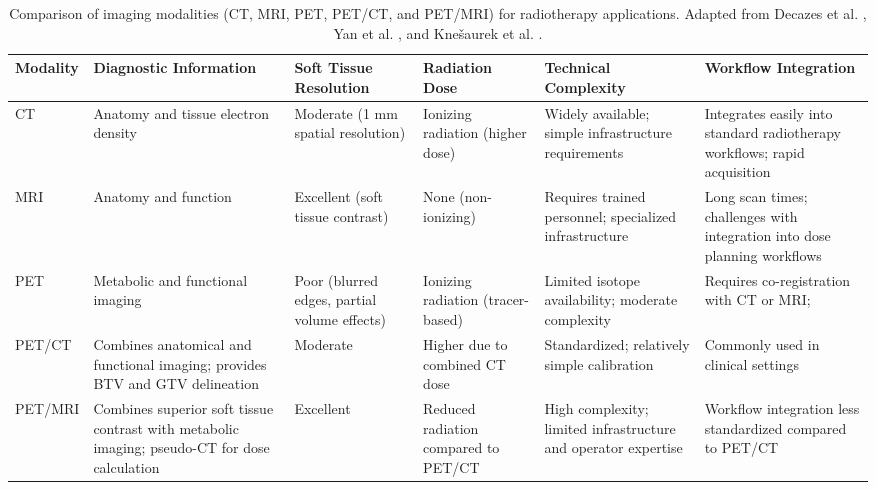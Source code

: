\documentclass[11pt]{article} %
\begin{document}
\begin{landscape}
\begin{table}[H]
\centering
\renewcommand{\arraystretch}{1.5} %
\setlength{\tabcolsep}{6pt} %
\begin{tabular}{|l|>{\raggedright\arraybackslash}p{3.5cm}|>{\raggedright\arraybackslash}p{2.3cm}|>{\raggedright\arraybackslash}p{5.5cm}|>{\raggedright\arraybackslash}p{4.5cm}|>{\raggedright\arraybackslash}p{4.5cm}|}
\hline
\textbf{Modality} & \textbf{Diagnostic Information} & \textbf{Soft Tissue Resolution} & \textbf{Radiation Dose} & \textbf{Technical Complexity} & \textbf{Workflow Integration} \\ \hline
CT & Anatomy and tissue electron density & Moderate (1 mm spatial resolution) & Ionizing radiation (higher dose) & Widely available; simple infrastructure requirements & Integrates easily into standard radiotherapy workflows; rapid acquisition \\ \hline
MRI & Anatomy and function & Excellent (soft tissue contrast) & None (non-ionizing) & Requires trained personnel; specialized infrastructure & Long scan times; challenges with integration into dose planning workflows \\ \hline
PET & Metabolic and functional imaging & Poor (blurred edges, partial volume effects) & Ionizing radiation (tracer-based) & Limited isotope availability; moderate complexity   & Requires co-registration with CT or MRI; \\ \hline
PET/CT & Combines anatomical and functional imaging; provides BTV and GTV delineation & Moderate & Higher due to combined CT dose & Standardized; relatively simple calibration & Commonly used in clinical settings \\ \hline
PET/MRI & Combines superior soft tissue contrast with metabolic imaging; pseudo-CT for dose calculation & Excellent & Reduced radiation compared to PET/CT & High complexity; limited infrastructure and operator expertise & Workflow integration less standardized compared to PET/CT \\ \hline
\end{tabular}
\caption{Comparison of imaging modalities (CT, MRI, PET, PET/CT, and PET/MRI) for radiotherapy applications. Adapted from Decazes et al. \cite{decazes2021}, Yan et al. \cite{yan2024}, and Knešaurek et al. \cite{knesaurek2018}.}
\label{tab:modality_comparison}
\end{table}
\end{landscape}
\end{document}

